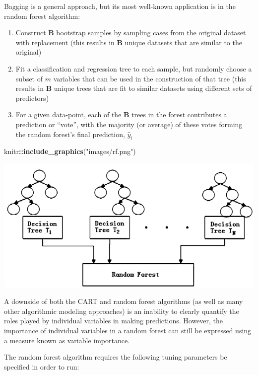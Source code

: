 \documentclass[
  a4paper,
  twoside,
  openright]{book}
\newenvironment{Shaded}{\begin{snugshade}}{\end{snugshade}}
\newcommand{\FunctionTok}[1]{\textcolor[rgb]{0.13,0.29,0.53}{\textbf{#1}}}
\newcommand{\NormalTok}[1]{#1}
\newcommand{\SpecialCharTok}[1]{\textcolor[rgb]{0.81,0.36,0.00}{\textbf{#1}}}
\newcommand{\StringTok}[1]{\textcolor[rgb]{0.31,0.60,0.02}{#1}}
\providecommand{\tightlist}{%
  \setlength{\itemsep}{0pt}\setlength{\parskip}{0pt}}
\theoremstyle{definition}
\theoremstyle{definition}
\theoremstyle{definition}
\theoremstyle{definition}
\theoremstyle{remark}
\begin{document}
Bagging is a general approach, but its most well-known application is in the random forest algorithm:

\begin{enumerate}
\def\labelenumi{\arabic{enumi}.}
\tightlist
\item
  Construct \(\boldsymbol{B}\) bootstrap samples by sampling cases from the original dataset with replacement (this results in \(\boldsymbol{B}\) unique datasets that are similar to the original)
\item
  Fit a classification and regression tree to each sample, but randomly choose a subset of \(m\) variables that can be used in the construction of that tree (this results in \(\boldsymbol{B}\) unique trees that are fit to similar datasets using different sets of predictors)
\item
  For a given data-point, each of the \(\boldsymbol{B}\) trees in the forest contributes a prediction or ``vote'', with the majority (or average) of these votes forming the random forest's final prediction, \(\hat{y}_i\)
\end{enumerate}

\begin{Shaded}
\begin{Highlighting}[]
\NormalTok{knitr}\SpecialCharTok{::}\FunctionTok{include\_graphics}\NormalTok{(}\StringTok{"images/rf.png"}\NormalTok{)}
\end{Highlighting}
\end{Shaded}

\includegraphics[width=0.8\linewidth]{images/rf}

A downside of both the CART and random forest algorithms (as well as many other algorithmic modeling approaches) is an inability to clearly quantify the roles played by individual variables in making predictions. However, the importance of individual variables in a random forest can still be expressed using a measure known as variable importance.

The random forest algorithm requires the following tuning parameters be specified in order to run:
\end{document}
